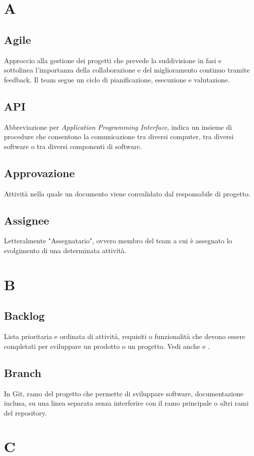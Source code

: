 \section{A}
    \subsection{Agile}
    Approccio alla gestione dei progetti che prevede la suddivisione in fasi e sottolinea 
    l'importanza della collaborazione e del miglioramento continuo tramite feedback. 
    Il team segue un ciclo di pianificazione, esecuzione e valutazione.
    \subsection{API}
    Abbreviazione per \textit{Application Programming Interface}, indica un insieme di 
    procedure che consentono la comunicazione tra diversi computer, tra diversi 
    software o tra diversi componenti di software.
    \subsection{Approvazione}
    Attività nella quale un documento viene convalidato dal responsabile di progetto.
    \subsection{Assignee}
    Letteralmente "Assegnatario", ovvero membro del team a cui è assegnato lo
    svolgimento di una determinata attività.
\pagebreak
\section{B}
    \subsection{Backlog}
    Lista prioritaria e ordinata di attività, requisiti o funzionalità che devono 
    essere completati per sviluppare un prodotto o un progetto.
    Vedi anche  e .
    \subsection{Branch} 
    In Git, ramo del progetto che permette di sviluppare software, documentazione inclusa, su una linea separata 
    senza interferire con il ramo principale o altri rami del repository.
\pagebreak
\section{C}

